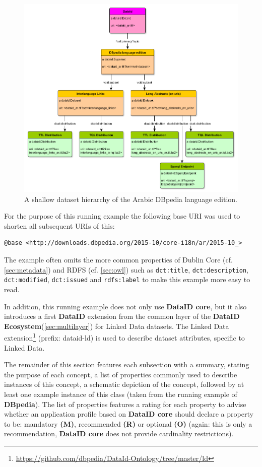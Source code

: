 \documentclass[a4paper,english,twoside,BCOR1.5cm,headsepline,DIV12,appendixprefix,final,12pt]{scrbook}
\newcommand{\ecosystem}{{\ttfamily\bfseries DataID Ecosystem}\xspace}
\newcommand{\dataid}{{\ttfamily\bfseries DataID}\xspace}
\newcommand{\core}{{\ttfamily\bfseries DataID core}\xspace}
\newcommand{\dbpedia}{{\ttfamily\bfseries DBpedia}\xspace}
\newcommand{\prop}[1]{{{\texttt{#1}}}}
\newcommand\footnoteurl[1]{\footnote{\scriptsize\url{#1}}}
\begin{document}
\begin{figure}[!htbp]
\centering
  \includegraphics[width=13cm]{images/ExampleStructure.png}
  \caption{A shallow dataset hierarchy of the Arabic DBpedia language edition.}
  \label{fig:example}
\end{figure}

For the purpose of this running example the following base URI was used to shorten all subsequent URIs of this:
\begin{lstlisting}[language=ttl,label=lst:graph,linewidth=\columnwidth,breaklines=true,basicstyle=\ttfamily\footnotesize]
@base <http://downloads.dbpedia.org/2015-10/core-i18n/ar/2015-10_>
\end{lstlisting}

The example often omits the more common properties of Dublin Core (cf. \cref{sec:metadata}) and RDFS (cf. \cref{sec:owl}) such as \prop{dct:title}, \prop{dct:description}, \prop{dct:modified}, \prop{dct:issued} and \prop{rdfs:label} to make this example more easy to read. 

In addition, this running example does not only use \core, but it also introduces a first \dataid extension from the common layer of the \ecosystem (\cref{sec:multilayer}) for Linked Data datasets. The Linked Data extension\footnoteurl{https://github.com/dbpedia/DataId-Ontology/tree/master/ld} (prefix: dataid-ld) is used to describe dataset attributes, specific to Linked Data.

The remainder of this section features each subsection with a summary, stating the purpose of each concept, a list of properties commonly used to describe instances of this concept, a schematic depiction of the concept, followed by at least one example instance of this class (taken from the running example of \dbpedia). The list of properties features a rating for each property to advise whether an application profile based on \core should declare a property to be: mandatory \textbf{(M)}, recommended \textbf{(R)} or optional \textbf{(O)} (again: this is only a recommendation, \core does not provide cardinality restrictions).
\end{document}
